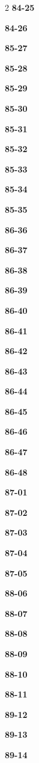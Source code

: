 \documentclass[10pt,a4paper]{article}
\begin{document}
\begin{multicols}{2}
\noindent\textbf{84-25}\ \par
\noindent\textbf{84-26}\ \par
\noindent\textbf{85-27}\ \par
\noindent\textbf{85-28}\ \par
\noindent\textbf{85-29}\ \par
\noindent\textbf{85-30}\ \par
\noindent\textbf{85-31}\ \par
\noindent\textbf{85-32}\ \par
\noindent\textbf{85-33}\ \par
\noindent\textbf{85-34}\ \par
\noindent\textbf{85-35}\ \par
\noindent\textbf{86-36}\ \par
\noindent\textbf{86-37}\ \par
\noindent\textbf{86-38}\ \par
\noindent\textbf{86-39}\ \par
\noindent\textbf{86-40}\ \par
\noindent\textbf{86-41}\ \par
\noindent\textbf{86-42}\ \par
\noindent\textbf{86-43}\ \par
\noindent\textbf{86-44}\ \par
\noindent\textbf{86-45}\ \par
\noindent\textbf{86-46}\ \par
\noindent\textbf{86-47}\ \par
\noindent\textbf{86-48}\ \par
\noindent\textbf{87-01}\ \par
\noindent\textbf{87-02}\ \par
\noindent\textbf{87-03}\ \par
\noindent\textbf{87-04}\ \par
\noindent\textbf{87-05}\ \par
\noindent\textbf{88-06}\ \par
\noindent\textbf{88-07}\ \par
\noindent\textbf{88-08}\ \par
\noindent\textbf{88-09}\ \par
\noindent\textbf{88-10}\ \par
\noindent\textbf{88-11}\ \par
\noindent\textbf{89-12}\ \par
\noindent\textbf{89-13}\ \par
\noindent\textbf{89-14}\ \par

\end{multicols}
\end{document}
